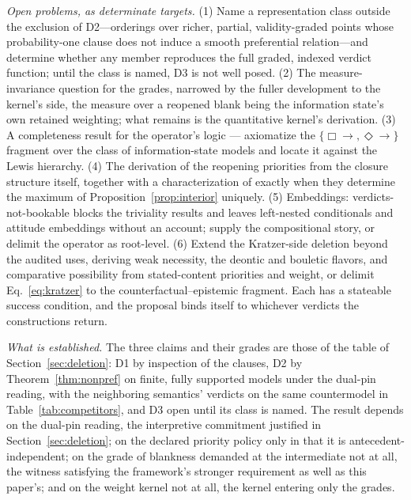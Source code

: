 \emph{Open problems, as determinate targets.} (1) Name a representation class outside the exclusion of D2---orderings over richer, partial, validity-graded points whose probability-one clause does not induce a smooth preferential relation---and determine whether any member reproduces the full graded, indexed verdict function; until the class is named, D3 is not well posed. (2) The measure-invariance question for the grades, narrowed by the fuller development to the kernel's side, the measure over a reopened blank being the information state's own retained weighting; what remains is the quantitative kernel's derivation. (3) A completeness result for the operator's logic --- axiomatize the $\{\Box\!\!\rightarrow, \Diamond\!\!\rightarrow\}$ fragment over the class of information-state models and locate it against the Lewis hierarchy. (4) The derivation of the reopening priorities from the closure structure itself, together with a characterization of exactly when they determine the maximum of Proposition~\ref{prop:interior} uniquely. (5) Embeddings: verdicts-not-bookable blocks the triviality results and leaves left-nested conditionals and attitude embeddings without an account; supply the compositional story, or delimit the operator as root-level. (6) Extend the Kratzer-side deletion beyond the audited uses, deriving weak necessity, the deontic and bouletic flavors, and comparative possibility from stated-content priorities and weight, or delimit Eq.~\eqref{eq:kratzer} to the counterfactual--epistemic fragment. Each has a stateable success condition, and the proposal binds itself to whichever verdicts the constructions return.

\emph{What is established.} The three claims and their grades are those of the table of Section~\ref{sec:deletion}: D1 by inspection of the clauses, D2 by Theorem~\ref{thm:nonpref} on finite, fully supported models under the dual-pin reading, with the neighboring semantics' verdicts on the same countermodel in Table~\ref{tab:competitors}, and D3 open until its class is named. The result depends on the dual-pin reading, the interpretive commitment justified in Section~\ref{sec:deletion}; on the declared priority policy only in that it is antecedent-independent; on the grade of blankness demanded at the intermediate not at all, the witness satisfying the framework's stronger requirement as well as this paper's; and on the weight kernel not at all, the kernel entering only the grades.

